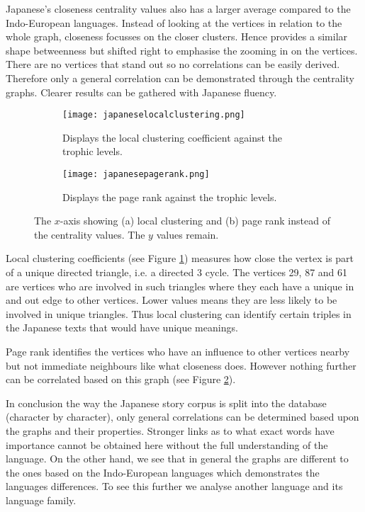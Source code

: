 Japanese's closeness centrality values also has a larger average compared to the Indo-European languages. Instead of looking at the vertices in relation to the whole graph, closeness focusses on the closer clusters. Hence provides a similar shape betweenness but shifted right to emphasise the zooming in on the vertices. There are no vertices that stand out so no correlations can be easily derived. Therefore only a general correlation can be demonstrated through the centrality graphs. Clearer results can be gathered with Japanese fluency.

\begin{figure}[!htb]
\centering
\begin{subfigure}{.45\textwidth}
	\hspace{-1cm} 
	\texttt{[image: japaneselocalclustering.png]}
	\caption{Displays the local clustering coefficient against the trophic levels.}
	\label{fig:jplc}
\end{subfigure}
\hfill
\begin{subfigure}{.45\textwidth}
	\hspace{-1cm} 
	\texttt{[image: japanesepagerank.png]}
	\caption{Displays the page rank against the trophic levels.}
	\label{fig:jppr}
\end{subfigure}
\caption{The $x$-axis showing (a) local clustering and (b) page rank instead of the centrality values. The $y$ values remain.}
\label{fig:jpother}
\end{figure}

Local clustering coefficients (see Figure \ref{fig:jplc}) measures how close the vertex is part of a unique directed triangle, i.e. a directed 3 cycle. The vertices 29, 87 and 61 are vertices who are involved in such triangles where they each have a unique in and out edge to other vertices. Lower values means they are less likely to be involved in unique triangles. Thus local clustering can identify certain triples in the Japanese texts that would have unique meanings. 

Page rank identifies the vertices who have an influence to other vertices nearby but not immediate neighbours like what closeness does. However nothing further can be correlated based on this graph (see Figure \ref{fig:jppr}).

In conclusion the way the Japanese story corpus is split into the database (character by character), only general correlations can be determined based upon the graphs and their properties. Stronger links as to what exact words have importance cannot be obtained here without the full understanding of the language. On the other hand, we see that in general the graphs are different to the ones based on the Indo-European languages which demonstrates the languages differences. To see this further we analyse another language and its language family.

